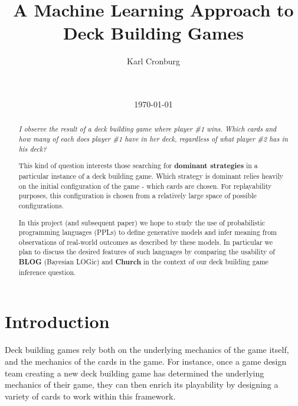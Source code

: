\documentclass{acm_proc_article-sp}
\begin{document}
\title{A Machine Learning Approach to Deck Building Games}

\author{
  \alignauthor
  Karl Cronburg                   \\
   \\
         \\
}
\date{\today}

\maketitle

\begin{abstract}
\emph{I observe the result of a deck building game where player \#1 wins.
Which cards and how many of each does player \#1 have in her deck,
regardless of what player \#2 has in his deck?}

This kind of question interests those searching for {\bf dominant
strategies} in a particular instance of a deck building game.
Which strategy is dominant relies heavily on the initial configuration
of the game - which cards are chosen. For replayability purposes,
this configuration is chosen from a relatively large space of
possible configurations.

In this project (and subsequent paper) we hope to study the
use of probabilistic programming languages (PPLs) to define generative models
and infer meaning from observations of real-world outcomes as described
by these models. In particular we plan to discuss the desired features
of such languages by comparing the usability of {\bf BLOG} (Bayesian LOGic)
and {\bf Church} in the context of our deck building game inference question.


\end{abstract}

\section{Introduction}

Deck building games rely both on the underlying mechanics of the game itself,
and the mechanics of the cards in the game. For instance, once a game design team
creating a new deck building game has determined the underlying mechanics of
their game, they can then enrich its playability by designing a variety of cards
to work within this framework.
\end{document}
